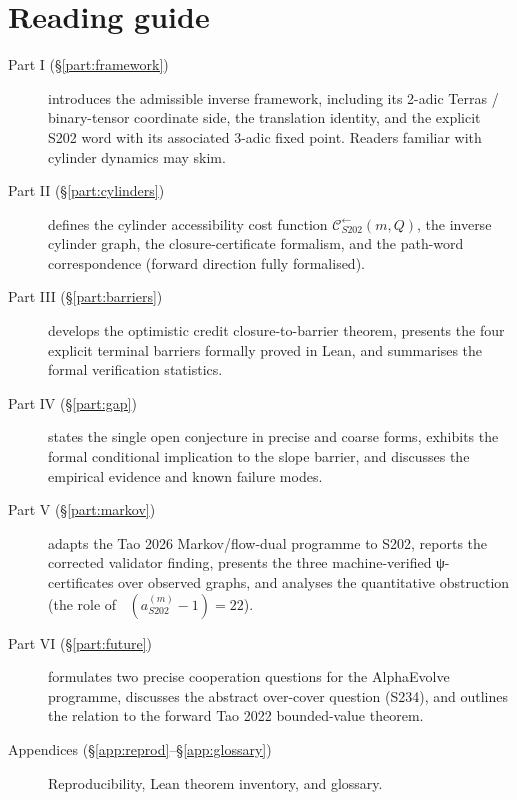 \documentclass[11pt,a4paper]{article}
\theoremstyle{plain}
\theoremstyle{definition}
\newcommand{\aSat}{a_{S202}^{(m)}}
\newcommand{\Cback}{\mathcal{C}^{\!\leftarrow}_{S202}}
\DeclareMathOperator{\nuthree}{\nu_3}
\begin{document}
\newpage
\tableofcontents
\newpage

\section*{Reading guide}

\begin{description}
  \item[Part I (\S\ref{part:framework})] introduces the admissible
    inverse framework, including its 2-adic Terras / binary-tensor
    coordinate side, the translation identity, and the explicit S202
    word with its associated 3-adic fixed point. Readers familiar
    with cylinder dynamics may skim.
  \item[Part II (\S\ref{part:cylinders})] defines the cylinder
    accessibility cost function $\Cback(m, Q)$, the inverse cylinder
    graph, the closure-certificate formalism, and the path-word
    correspondence (forward direction fully formalised).
  \item[Part III (\S\ref{part:barriers})] develops the optimistic
    credit closure-to-barrier theorem, presents the four explicit
    terminal barriers formally proved in Lean, and summarises the
    formal verification statistics.
  \item[Part IV (\S\ref{part:gap})] states the single open conjecture
    in precise and coarse forms, exhibits the formal conditional
    implication to the slope barrier, and discusses the empirical
    evidence and known failure modes.
  \item[Part V (\S\ref{part:markov})] adapts the Tao 2026
    Markov/flow-dual programme to S202, reports the corrected
    validator finding, presents the three machine-verified
    ψ-certificates over observed graphs, and analyses the
    quantitative obstruction (the role of
    $\nuthree(\aSat - 1) = 22$).
  \item[Part VI (\S\ref{part:future})] formulates two precise
    cooperation questions for the AlphaEvolve programme, discusses
    the abstract over-cover question (S234), and outlines the
    relation to the forward Tao 2022 bounded-value theorem.
  \item[Appendices (\S\ref{app:reprod}--\S\ref{app:glossary})]
    Reproducibility, Lean theorem inventory, and glossary.
\end{description}
\end{document}
